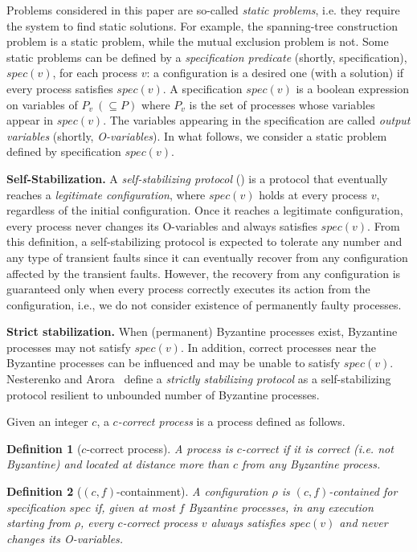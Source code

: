 \documentclass[11pt]{article}
\newtheorem{defi}{Definition}
\newenvironment{definition}[1]{\vspace{-0.25cm}\begin{defi}#1}{\end{defi}\vspace{-0.3cm}}
\begin{document}
Problems considered in this paper are so-called \emph{static problems}, 
i.e. they require the system to find static solutions.
For example, the spanning-tree construction problem is a static problem,
while the mutual exclusion problem is not.
Some static problems can be defined by a \emph{specification predicate}
(shortly, specification), $spec(v)$, for each process $v$:
a configuration is a desired one (with a solution) if 
every process satisfies $spec(v)$.
A specification $spec(v)$ is a boolean expression
on variables of $P_v~(\subseteq P)$ where $P_v$ is the set of processes
whose variables appear in $spec(v)$.
The variables appearing in the specification are
called \emph{output variables} (shortly, \emph{O-variables}).
In what follows, we consider a static problem defined by
specification $spec(v)$.

\noindent\textbf{Self-Stabilization.} A \emph{self-stabilizing protocol} (\cite{D74j}) is a protocol
that eventually reaches a \emph{legitimate configuration},
where $spec(v)$ holds at every process $v$, regardless of the initial configuration.
Once it reaches a legitimate configuration, every process never
changes its O-variables and always satisfies $spec(v)$.
 From this definition, a self-stabilizing protocol is expected to tolerate 
any number and any type of transient faults since it can eventually 
recover from any configuration affected by the transient faults.
However, the recovery from any configuration is guaranteed
only when every process correctly executes its action from 
the configuration, i.e., we do not consider existence of
permanently faulty processes.

\noindent\textbf{Strict stabilization.} When (permanent) Byzantine 
processes exist, Byzantine processes may not satisfy $spec(v)$.
In addition, correct processes near the Byzantine processes
can be influenced and may be unable to satisfy $spec(v)$.
Nesterenko and Arora~\cite{NA02c} define
a \emph{strictly stabilizing protocol} as a self-stabilizing protocol 
resilient to unbounded number of Byzantine processes.

Given an integer $c$, a \emph{$c$-correct process} is a process 
 defined as follows.

\begin{definition}[$c$-correct process]
A process is $c$-correct if it is correct (\emph{i.e.} not Byzantine) and located at distance more than $c$ from any Byzantine process.
\end{definition}

\begin{definition}[$(c,f)$-containment]
\label{def:cfcontained}
A configuration $\rho$ is \emph{$(c,f)$-contained} for specification
$spec$ if, given at most $f$ Byzantine processes, in any execution
starting from $\rho$, every $c$-correct process $v$ always satisfies $spec(v)$ and never changes
its O-variables.
\end{definition}
\end{document}
